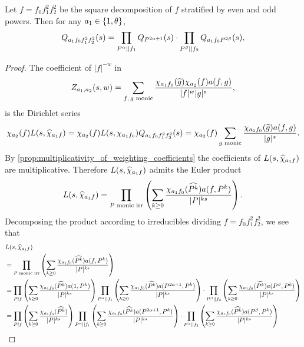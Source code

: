 \documentclass[12pt,reqno,oneside]{amsart}
\begin{document}
    \begin{theorem}\label{thm:correction_polynomial_Euler_product}
        Let $f = f_{0}f_{1}^{2}f_{2}^{2}$ be the square decomposition of $f$ stratified by even and odd powers. Then for any $a_{1} \in \{1,\theta\}$,
        \[
            Q_{a_{1}f_{0}f_{1}^{2}f_{2}^{2}}(s) = \prod_{P^{\alpha} \mid\mid f_{1}}Q_{P^{2\alpha+1}}(s) \cdot \prod_{P^{\beta} \mid\mid f_{2}}Q_{a_{1}f_{0}P^{2\beta}}(s),
        \]
    \end{theorem}
    \begin{proof}
        The coefficient of $|f|^{-w}$ in
        \[
            Z_{a_{1},a_{2}}(s,w) = \sum_{\text{$f,g$ monic}}\frac{\chi_{a_{1}f_{0}}(\widehat{g})\chi_{a_{2}}(f)a(f,g)}{|f|^{w}|g|^{s}},
        \]
        is the Dirichlet series
        \[
            \chi_{a_{2}}(f)L(s,\widehat{\chi}_{a_{1}f}) = \chi_{a_{2}}(f)L(s,\chi_{a_{1}f_{0}})Q_{a_{1}f_{0}f_{1}^{2}f_{2}^{2}}(s) = \chi_{a_{2}}(f)\sum_{\text{$g$ monic}}\frac{\chi_{a_{1}f_{0}}(\widehat{g})a(f,g)}{|g|^{s}}.
        \]
        By \cref{prop:multiplicativity_of_weighting_coefficients} the coefficients of $L(s,\widehat{\chi}_{a_{1}f})$ are multiplicative. Therefore $L(s,\widehat{\chi}_{a_{1}f})$ admits the Euler product
        \[
            L(s,\widehat{\chi}_{a_{1}f}) = \prod_{\text{$P$ monic irr}}\left(\sum_{k \ge 0}\frac{\chi_{a_{1}f_{0}}(\widehat{P^{k}})a(f,P^{k})}{|P|^{ks}}\right).
        \]
        Decomposing the product according to irreducibles dividing $f = f_{0}f_{1}^{2}f_{2}^{2}$, we see that
        \begin{align*}
            & L(s,\what{\chi}_{a_{1}f}) \\
            &= \prod_{\text{$P$ monic irr}}\left(\sum_{k \ge 0}\frac{\chi_{a_{1}f_{0}}(\what{P^{k}})a(f,P^{k})}{|P|^{ks}}\right) \\
            &= \prod_{P \nmid f}\left(\sum_{k \ge 0}\frac{\chi_{a_{1}f_{0}}(\what{P^{k}})a(1,P^{k})}{|P|^{ks}}\right)\prod_{P^{\a} \mid\mid f_{1}}\left(\sum_{k \ge 0}\frac{\chi_{a_{1}f_{0}}(\what{P^{k}})a(P^{2\a+1},P^{k})}{|P|^{ks}}\right) \cdot \prod_{P^{\b} \mid\mid f_{2}}\left(\sum_{k \ge 0}\frac{\chi_{a_{1}f_{0}}(\what{P^{k}})a(P^{\b},P^{k})}{|P|^{ks}}\right) \\
            &= \prod_{P \nmid f}\left(\sum_{k \ge 0}\frac{\chi_{a_{1}f_{0}}(\what{P^{k}})}{|P|^{ks}}\right)\prod_{P^{\a} \mid\mid f_{1}}\left(\sum_{k \ge 0}\frac{\chi_{a_{1}f_{0}}(\what{P^{k}})a(P^{2\a+1},P^{k})}{|P|^{ks}}\right) \cdot \prod_{P^{\b} \mid\mid f_{2}}\left(\sum_{k \ge 0}\frac{\chi_{a_{1}f_{0}}(\what{P^{k}})a(P^{\b},P^{k})}{|P|^{ks}}\right) \\

\end{align*}
\end{proof}
\end{document}
